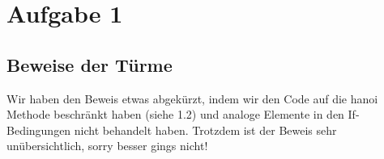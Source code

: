 
\newcommand{\dozent}{Prof. Dr. Claudia Müller-Birn, Barry Linnert}					%
\newcommand{\tutor}{Thierry Meurers}						%
\newcommand{\tutoriumNo}{10}				%
\newcommand{\ubungNo}{06}									%
\newcommand{\veranstaltung}{Objektorientierte Programmierung}	%
\newcommand{\semester}{SoSe 17}						%
\newcommand{\studenten}{Stefaan Hessmann, Jaap Pedersen, Mark Niehues}			%




\section{Aufgabe 1}

\subsection{Beweise der Türme}
Wir haben den Beweis etwas abgekürzt, indem wir den Code auf die hanoi Methode beschränkt haben (siehe 1.2) und analoge Elemente in den If-Bedingungen nicht behandelt haben.
Trotzdem ist der Beweis sehr unübersichtlich, sorry besser gings nicht!


